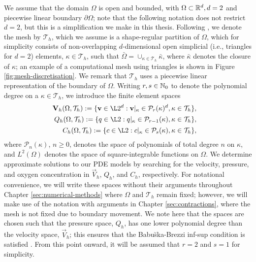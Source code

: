         \setcounter{equation}{0}
        We assume that the domain $\Omega$ is open and bounded, with $\Omega \subset \mathbb{R}^d, d = 2$ and piecewise linear boundary $\partial\Omega$; note that the following notation does not restrict $d=2$, but this is a simplification we make in this thesis. Following \cite{cangianiHpVersionDiscontinuousGalerkin2017}, we denote the mesh by $\mathcal{T}_h$, which we assume is a shape-regular partition of $\Omega$, which for simplicity consists of non-overlapping $d$-dimensional open simplicial (i.e., triangles for $d=2$) elements, $\kappa \in \mathcal{T}_h$, such that $\bar{\Omega} = \cup_{\kappa \in \mathcal{T}_h} \bar{\kappa}$, where $\bar{\kappa}$ denotes the closure of $\kappa$; an example of a computational mesh using triangles is shown in Figure \ref{fig:mesh-discretisation}. We remark that $\mathcal{T}_h$ uses a piecewise linear representation of the boundary of $\Omega$. Writing $r, s \in \mathbb{N}_0$ to denote the polynomial degree on a $\kappa \in \mathcal{T}_h$, we introduce the finite element spaces
        \begin{align}
            \begin{split}
                \vec{V}_h (\Omega, \mathcal{T}_h) & := \{ \vec{v} \in \L2^d : \vec{v}|_\kappa \in \mathcal{P}_r(\kappa)^d, \kappa \in \mathcal{T}_h \},
            \end{split}\\
            \begin{split}
                Q_h (\Omega, \mathcal{T}_h) & := \{ q \in \L2 : q|_\kappa \in \mathcal{P}_{r-1}(\kappa), \kappa \in \mathcal{T}_h \},
            \end{split}\\
            \begin{split}
                C_h (\Omega, \mathcal{T}_h) & := \{ c \in \L2 : c|_\kappa \in \mathcal{P}_{s}(\kappa), \kappa \in \mathcal{T}_h \},
            \end{split}
            \label{eq:velocity-spaces}
        \end{align}
        where $\mathcal{P}_n(\kappa)$, $n \geq 0$, denotes the space of polynomials of total degree $n$ on $\kappa$, and $L^2(\Omega)$ denotes the space of square-integrable functions on $\Omega$. We determine approximate solutions to our PDE models by searching for the velocity, pressure, and oxygen concentration in $\vec{V}_h$, $Q_h$, and $C_h$, respectively. For notational convenience, we will write these spaces without their arguments throughout Chapter \ref{sec:numerical-methods} where $\Omega$ and $\mathcal{T}_h$ remain fixed; however, we will make use of the notation with arguments in Chapter \ref{sec:contractions}, where the mesh is not fixed due to boundary movement. We note here that the spaces are chosen such that the pressure space, $Q_h$, has one lower polynomial degree than the velocity space, $\vec{V}_h$; this ensures that the Babu\u ska-Brezzi inf-sup condition is satisfied \cite{gerdesHpfiniteElementSimulations1999}. From this point onward, it will be assumed that $r = 2$ and $s = 1$ for simplicity.
    
